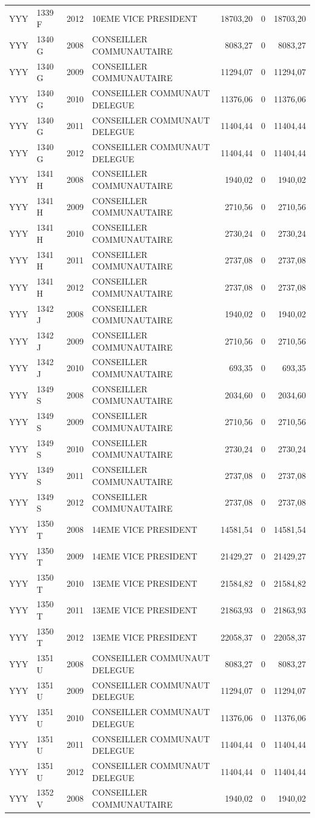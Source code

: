 \begin{longtable}[]{@{}llrlrrr@{}}
YYY & 1339 F & 2012 & 10EME VICE PRESIDENT & 18703,20 & 0 &
18703,20\tabularnewline
YYY & 1340 G & 2008 & CONSEILLER COMMUNAUTAIRE & 8083,27 & 0 &
8083,27\tabularnewline
YYY & 1340 G & 2009 & CONSEILLER COMMUNAUTAIRE & 11294,07 & 0 &
11294,07\tabularnewline
YYY & 1340 G & 2010 & CONSEILLER COMMUNAUT DELEGUE & 11376,06 & 0 &
11376,06\tabularnewline
YYY & 1340 G & 2011 & CONSEILLER COMMUNAUT DELEGUE & 11404,44 & 0 &
11404,44\tabularnewline
YYY & 1340 G & 2012 & CONSEILLER COMMUNAUT DELEGUE & 11404,44 & 0 &
11404,44\tabularnewline
YYY & 1341 H & 2008 & CONSEILLER COMMUNAUTAIRE & 1940,02 & 0 &
1940,02\tabularnewline
YYY & 1341 H & 2009 & CONSEILLER COMMUNAUTAIRE & 2710,56 & 0 &
2710,56\tabularnewline
YYY & 1341 H & 2010 & CONSEILLER COMMUNAUTAIRE & 2730,24 & 0 &
2730,24\tabularnewline
YYY & 1341 H & 2011 & CONSEILLER COMMUNAUTAIRE & 2737,08 & 0 &
2737,08\tabularnewline
YYY & 1341 H & 2012 & CONSEILLER COMMUNAUTAIRE & 2737,08 & 0 &
2737,08\tabularnewline
YYY & 1342 J & 2008 & CONSEILLER COMMUNAUTAIRE & 1940,02 & 0 &
1940,02\tabularnewline
YYY & 1342 J & 2009 & CONSEILLER COMMUNAUTAIRE & 2710,56 & 0 &
2710,56\tabularnewline
YYY & 1342 J & 2010 & CONSEILLER COMMUNAUTAIRE & 693,35 & 0 &
693,35\tabularnewline
YYY & 1349 S & 2008 & CONSEILLER COMMUNAUTAIRE & 2034,60 & 0 &
2034,60\tabularnewline
YYY & 1349 S & 2009 & CONSEILLER COMMUNAUTAIRE & 2710,56 & 0 &
2710,56\tabularnewline
YYY & 1349 S & 2010 & CONSEILLER COMMUNAUTAIRE & 2730,24 & 0 &
2730,24\tabularnewline
YYY & 1349 S & 2011 & CONSEILLER COMMUNAUTAIRE & 2737,08 & 0 &
2737,08\tabularnewline
YYY & 1349 S & 2012 & CONSEILLER COMMUNAUTAIRE & 2737,08 & 0 &
2737,08\tabularnewline
YYY & 1350 T & 2008 & 14EME VICE PRESIDENT & 14581,54 & 0 &
14581,54\tabularnewline
YYY & 1350 T & 2009 & 14EME VICE PRESIDENT & 21429,27 & 0 &
21429,27\tabularnewline
YYY & 1350 T & 2010 & 13EME VICE PRESIDENT & 21584,82 & 0 &
21584,82\tabularnewline
YYY & 1350 T & 2011 & 13EME VICE PRESIDENT & 21863,93 & 0 &
21863,93\tabularnewline
YYY & 1350 T & 2012 & 13EME VICE PRESIDENT & 22058,37 & 0 &
22058,37\tabularnewline
YYY & 1351 U & 2008 & CONSEILLER COMMUNAUT DELEGUE & 8083,27 & 0 &
8083,27\tabularnewline
YYY & 1351 U & 2009 & CONSEILLER COMMUNAUT DELEGUE & 11294,07 & 0 &
11294,07\tabularnewline
YYY & 1351 U & 2010 & CONSEILLER COMMUNAUT DELEGUE & 11376,06 & 0 &
11376,06\tabularnewline
YYY & 1351 U & 2011 & CONSEILLER COMMUNAUT DELEGUE & 11404,44 & 0 &
11404,44\tabularnewline
YYY & 1351 U & 2012 & CONSEILLER COMMUNAUT DELEGUE & 11404,44 & 0 &
11404,44\tabularnewline
YYY & 1352 V & 2008 & CONSEILLER COMMUNAUTAIRE & 1940,02 & 0 &
1940,02\tabularnewline

\end{longtable}
